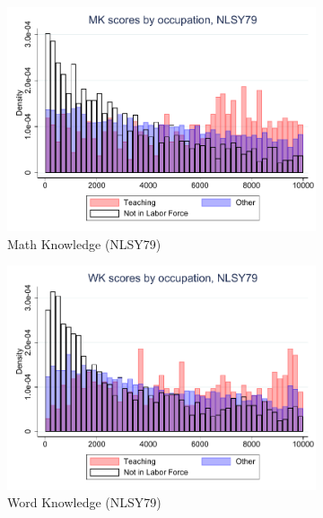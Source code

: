 \documentclass[onehalfspacing,11pt]{article}
\begin{document}
	\begin{figure}
		\begin{subfigure}{0.49\textwidth}
			\includegraphics[width=\linewidth]{NLSY79_MK_occ.pdf}
			\caption{Math Knowledge (NLSY79)} \label{fig:nlsy79math}
		\end{subfigure}
		\hspace*{\fill} %
		\begin{subfigure}{0.49\textwidth}
			\includegraphics[width=\linewidth]{NLSY79_WK_occ.pdf}
			\caption{Word Knowledge (NLSY79)} \label{fig:nlsy79word}
		\end{subfigure}
		\begin{subfigure}{0.49\textwidth}

\end{subfigure}
\end{figure}
\end{document}
